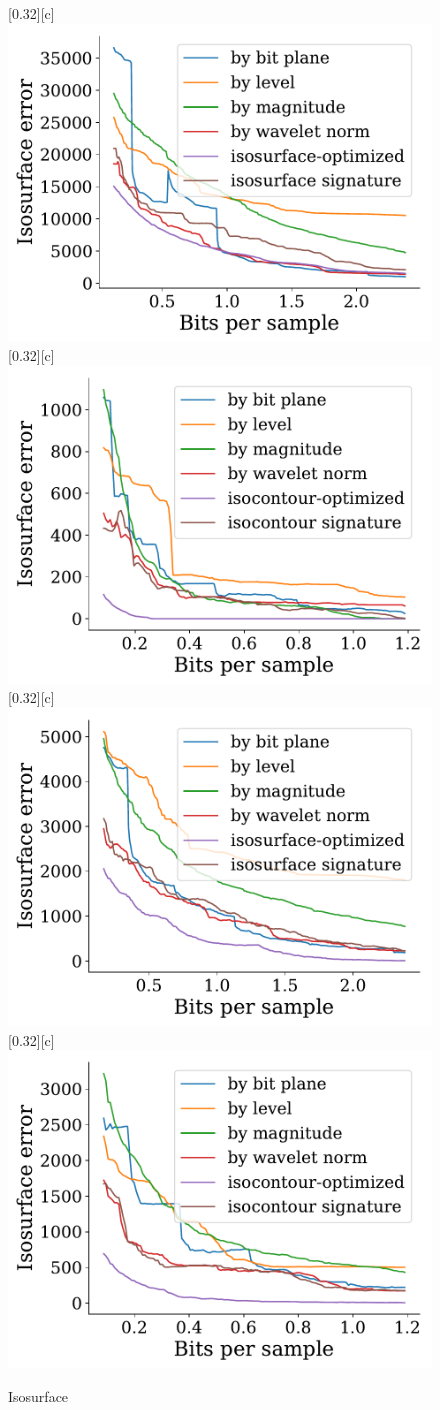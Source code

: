 \documentclass{article}
\begin{document}
\begin{figure}[htb]
        [0.32\linewidth][c]{%
                \includegraphics[width=0.3\linewidth]{img/supplementary/isocontour-optimized-vismale}}
        [0.32\linewidth][c]{%
                \includegraphics[width=0.3\linewidth]{img/supplementary/isocontour-optimized-karfs}}
        [0.32\linewidth][c]{%
                \includegraphics[width=0.3\linewidth]{img/supplementary/isocontour-optimized-aneurism}}
        [0.32\linewidth][c]{%
                \includegraphics[width=0.3\linewidth]{img/supplementary/isocontour-optimized-velocityz}}
        \caption{Isosurface}
\end{figure}
\end{document}
